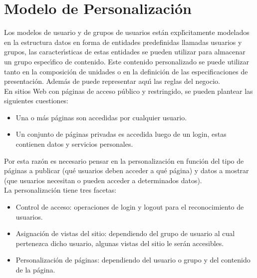 \section{Modelo de Personalizaci\'on}

Los modelos de usuario y de grupos de usuarios est\'an expl\'{\i}citamente modelados en 
la estructura datos en forma de entidades predefinidas llamadas usuarios y
grupos, las caracter\'{\i}sticas de estas entidades se pueden utilizar para
almacenar un grupo espec\'{\i}fico de contenido. Este contenido personalizado
se puede utilizar tanto en la composici\'on de unidades o en la definici\'on de las 
especificaciones de presentaci\'on.  Adem\'as de puede representar aqu\'{\i} las reglas
del negocio. \\[0.5cm]

En sitios Web con p\'aginas de acceso p\'ublico y restringido, se pueden plantear
las siguientes cuestiones: \\[0.5cm]

\begin{itemize}
    \item Una o m\'as p\'aginas son accedidas por cualquier usuario.
    \item Un conjunto de p\'aginas privadas es accedida luego de un login, 
        estas contienen datos y servicios personales.
\end{itemize}

Por esta raz\'on es necesario pensar en la personalizaci\'on en funci\'on del tipo 
de p\'aginas a publicar (qu\'e usuarios deben acceder a qu\'e p\'agina) y  datos a
mostrar (que usuarios necesitan o pueden acceder a determinados datos).\\[0.5cm]

La personalizaci\'on tiene tres facetas: \\[0.5cm]

\begin{itemize}
    \item Control de acceso: operaciones de login y logout para el 
        reconocimiento de usuarios.       
    \item Asignaci\'on de vistas del sitio: dependiendo del grupo de usuario al 
        cual pertenezca dicho usuario, algunas vistas del sitio le ser\'an
        accesibles.        
    \item Personalizaci\'on de p\'aginas: dependiendo del usuario o grupo y del 
        contenido de la p\'agina.       
\end{itemize}

